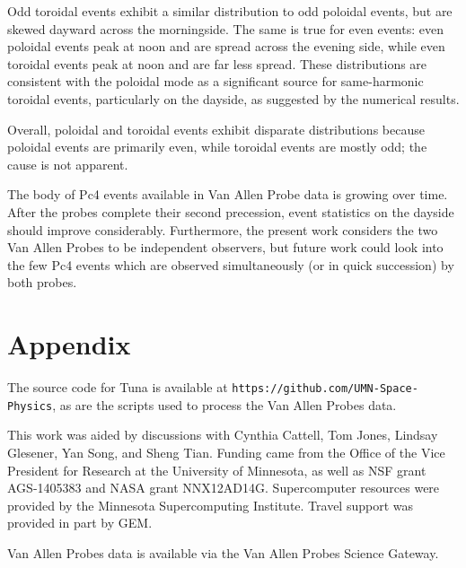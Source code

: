 \documentclass[draft,linenumbers]{agujournal}
\begin{document}
Odd toroidal events exhibit a similar distribution to odd poloidal events, but are skewed dayward across the morningside. The same is true for even events: even poloidal events peak at noon and are spread across the evening side, while even toroidal events peak at noon and are far less spread. These distributions are consistent with the poloidal mode as a significant source for same-harmonic toroidal events, particularly on the dayside, as suggested by the numerical results.

Overall, poloidal and toroidal events exhibit disparate distributions because poloidal events are primarily even, while toroidal events are mostly odd; the cause is not apparent.

The body of Pc4 events available in Van Allen Probe data is growing over time. After the probes complete their second precession, event statistics on the dayside should improve considerably. Furthermore, the present work considers the two Van Allen Probes to be independent observers, but future work could look into the few Pc4 events which are observed simultaneously (or in quick succession) by both probes.


\appendix

\section{Appendix}

The source code for Tuna is available at \texttt{https://github.com/UMN-Space-Physics}, as are the scripts used to process the Van Allen Probes data.


\acknowledgments

This work was aided by discussions with Cynthia Cattell, Tom Jones, Lindsay Glesener, Yan Song, and Sheng Tian. Funding came from the Office of the Vice President for Research at the University of Minnesota, as well as NSF grant AGS-1405383 and NASA grant NNX12AD14G. Supercomputer resources were provided by the Minnesota Supercomputing Institute. Travel support was provided in part by GEM.

Van Allen Probes data is available via the Van Allen Probes Science Gateway.

\end{document}
